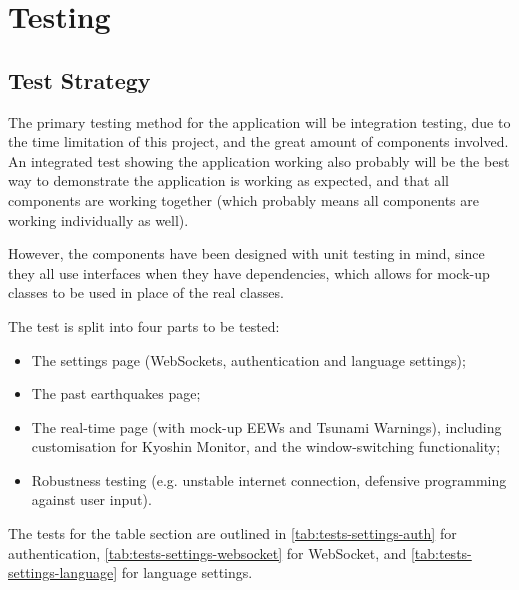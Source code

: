 \chapter{Testing}
\section{Test Strategy}

The primary testing method for the application will be integration testing, due to the time limitation of this project, and the great amount of components involved. An integrated test showing the application working also probably will be the best way to demonstrate the application is working as expected, and that all components are working together (which probably means all components are working individually as well).

However, the components have been designed with unit testing in mind, since they all use interfaces when they have dependencies, which allows for mock-up classes to be used in place of the real classes.

The test is split into four parts to be tested:
\begin{itemize}
    \item The settings page (WebSockets, authentication and language settings);
    \item The past earthquakes page;
    \item The real-time page (with mock-up EEWs and Tsunami Warnings), including customisation for Kyoshin Monitor, and the window-switching functionality;
    \item Robustness testing (e.g. unstable internet connection, defensive programming against user input).
\end{itemize}

The tests for the table section are outlined in \autoref{tab:tests-settings-auth} for authentication, \autoref{tab:tests-settings-websocket} for WebSocket, and \autoref{tab:tests-settings-language} for language settings.

